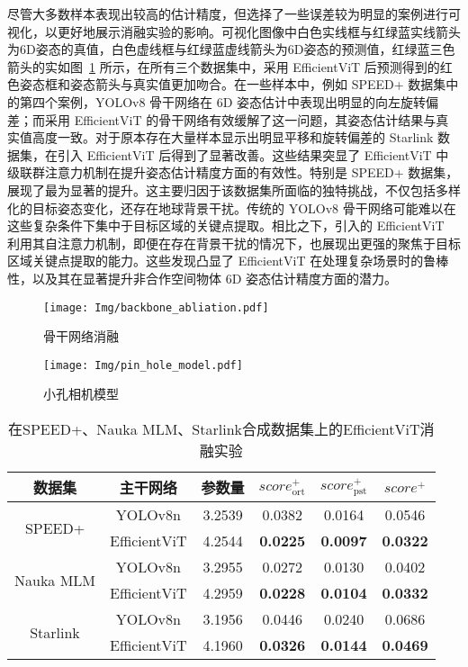 尽管大多数样本表现出较高的估计精度，但选择了一些误差较为明显的案例进行可视化，以更好地展示消融实验的影响。可视化图像中白色实线框与红绿蓝实线箭头为6D姿态的真值，白色虚线框与红绿蓝虚线箭头为6D姿态的预测值，红绿蓝三色箭头的实如图~\ref{fig:backbone_abliation} 所示，在所有三个数据集中，采用 EfficientViT 后预测得到的红色姿态框和姿态箭头与真实值更加吻合。在一些样本中，例如 SPEED+ 数据集中的第四个案例，YOLOv8 骨干网络在 6D 姿态估计中表现出明显的向左旋转偏差；而采用 EfficientViT 的骨干网络有效缓解了这一问题，其姿态估计结果与真实值高度一致。对于原本存在大量样本显示出明显平移和旋转偏差的 Starlink 数据集，在引入 EfficientViT 后得到了显著改善。这些结果突显了 EfficientViT 中级联群注意力机制在提升姿态估计精度方面的有效性。特别是 SPEED+ 数据集，展现了最为显著的提升。这主要归因于该数据集所面临的独特挑战，不仅包括多样化的目标姿态变化，还存在地球背景干扰。传统的 YOLOv8 骨干网络可能难以在这些复杂条件下集中于目标区域的关键点提取。相比之下，引入的 EfficientViT 利用其自注意力机制，即便在存在背景干扰的情况下，也展现出更强的聚焦于目标区域关键点提取的能力。这些发现凸显了 EfficientViT 在处理复杂场景时的鲁棒性，以及其在显著提升非合作空间物体 6D 姿态估计精度方面的潜力。

\begin{figure}[htbp]
	\centering
	\texttt{[image: Img/backbone\_abliation.pdf]}
	\caption{骨干网络消融}
	\label{fig:backbone_abliation}
	\vspace{-3ex}
\end{figure}
\begin{figure}[htbp]
	\centering
	\texttt{[image: Img/pin\_hole\_model.pdf]}
	\caption{小孔相机模型}
	\label{fig:pin_hole_model}
	\vspace{-3ex}
\end{figure}
\begin{table}[htbp]
	\centering
	\caption{在SPEED+、Nauka MLM、Starlink合成数据集上的EfficientViT消融实验}
	\label{tab:EfficientViTAblation}
	{%
		\begin{tabular}{c c c c c c} 
			\toprule[1.5pt]
			数据集 & 主干网络 & 参数量 & $score_{\text{ort}}^+$ & $score_{\text{pst}}^+$ & $score^+$ \\
			\midrule[1pt]
			\multirow{2}{*}{SPEED+}
			& YOLOv8n      & 3.2539 & 0.0382            & 0.0164            & 0.0546 \\
			& EfficientViT & 4.2544 & \textbf{0.0225}   & \textbf{0.0097}   & \textbf{0.0322} \\
			\midrule[1pt]
			\multirow{2}{*}{Nauka MLM}
			& YOLOv8n      & 3.2955 & 0.0272            & 0.0130            & 0.0402 \\
			& EfficientViT & 4.2959 & \textbf{0.0228}   & \textbf{0.0104}   & \textbf{0.0332} \\
			\midrule[1pt]
			\multirow{2}{*}{Starlink}
			& YOLOv8n      & 3.1956 & 0.0446            & 0.0240            & 0.0686 \\
			& EfficientViT & 4.1960 & \textbf{0.0326}   & \textbf{0.0144}   & \textbf{0.0469} \\
			\bottomrule[1.5pt]
		\end{tabular}
	}
\end{table}

